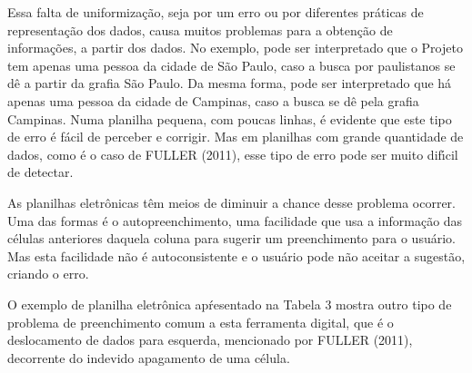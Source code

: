 \documentclass[
12pt,		%
openright,	%
twoside,  %
a4paper,			%
chapter=TITLE,		%
english,			%
french,				%
spanish,			%
brazil				%
]{USPSC-classe/USPSC}
\begin{document}
Essa falta de uniformiza\c{c}\~ao, seja por um erro ou por diferentes pr\'aticas de representa\c{c}\~ao dos dados, causa muitos problemas para a obten\c{c}\~ao de informa\c{c}\~oes, a partir dos dados. No exemplo, pode ser interpretado que o Projeto tem apenas uma pessoa da cidade de S\~ao Paulo, caso a busca por paulistanos se d\^e a partir da grafia \textquotedbl S\~ao Paulo\textquotedbl . Da mesma forma, pode ser interpretado que h\'a apenas uma pessoa da cidade de Campinas, caso a busca se d\^e pela grafia \textquotedbl Campinas\textquotedbl . Numa planilha pequena, com poucas linhas, \'e evidente que este tipo de erro \'e f\'acil de perceber e corrigir. Mas em planilhas com grande quantidade de dados, como \'e o caso de  FULLER (2011), esse tipo de erro pode ser muito dif\'{\i}cil de detectar.

















As planilhas eletr\^onicas t\^em meios de diminuir a chance desse problema ocorrer. Uma das formas \'e o autopreenchimento, uma facilidade que usa a informa\c{c}\~ao das c\'elulas anteriores daquela coluna para sugerir um preenchimento para o usu\'ario. Mas esta facilidade n\~ao \'e autoconsistente e o usu\'ario pode n\~ao aceitar a sugest\~ao, criando o erro.

















O exemplo de planilha eletr\^onica apŕesentado na Tabela 3 mostra outro tipo de problema de preenchimento comum a esta ferramenta digital, que \'e o deslocamento de dados para esquerda,  mencionado por  FULLER (2011), decorrente do indevido apagamento de uma c\'elula.
\end{document}
